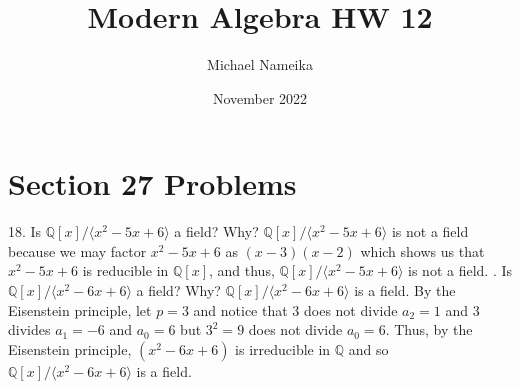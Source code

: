 \documentclass{article}
\title{Modern Algebra HW 12}
\author{Michael Nameika}
\date{November 2022}
\begin{document}
\maketitle

\section*{Section 27 Problems}
18. Is $\mathbb{Q}[x]/\langle x^2 - 5x + 6 \rangle$ a field? Why?
\newline\newline
$\mathbb{Q}[x]/\langle x^2 - 5x + 6\rangle$ is not a field because we may factor $x^2 - 5x + 6$ as $(x - 3)(x - 2)$ which shows us that $x^2 - 5x + 6$ is reducible in $\mathbb{Q}[x]$, and thus, $\mathbb{Q}[x]/\langle x^2 - 5x + 6 \rangle$ is not a field.
\newline{}. Is $\mathbb{Q}[x]/\langle x^2 - 6x + 6 \rangle$ a field? Why?
\newline\newline
$\mathbb{Q}[x]/\langle x^2 - 6x + 6\rangle$ is a field. By the Eisenstein principle, let $p = 3$ and notice that 3 does not divide $a_2 = 1$ and 3 divides $a_1 = -6$ and $a_0 = 6$ but $3^2 = 9$ does not divide $a_0 = 6$. Thus, by the Eisenstein principle, $(x^2 - 6x + 6)$ is irreducible in $\mathbb{Q}$ and so $\mathbb{Q}[x]/\langle x^2 - 6x + 6 \rangle$ is a field.
\end{document}

